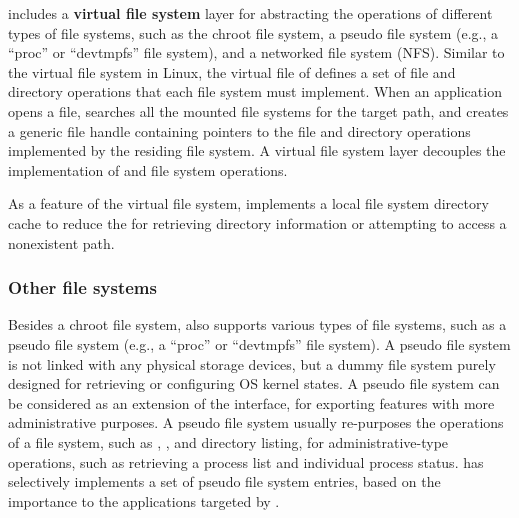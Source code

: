 \thelibos{} includes a {\bf virtual file system} layer for abstracting the operations
of different types of file systems,
such as the chroot file system, a pseudo file system (e.g., a ``proc'' or ``devtmpfs'' file system), and a networked file system (NFS).
Similar to the virtual file system in Linux,
the virtual file of \thelibos{} defines a set of file and directory operations that
each file system must implement.
When an application opens a file,
\thelibos{} searches all the mounted file systems for the target path,
and creates a generic file handle containing pointers
to the file and directory operations implemented by the residing file system.
A virtual file system layer decouples
the implementation of \linuxapis{} and file system operations.


As a feature of the virtual file system, \thelibos{} implements
a local file system directory cache
to reduce the \hostapis{} for retrieving directory information
or attempting to access a nonexistent path.











\subsubsection{Other file systems}


Besides a chroot file system,
\thelibos{} also supports various types of file systems,
such as a pseudo file system
(e.g., a ``proc'' or ``devtmpfs'' file system).
A pseudo file system is not linked with any physical storage devices,
but a dummy file system
purely designed for retrieving or configuring OS kernel states.
A pseudo file system can be considered as an extension of the \linuxapi{} interface,
for exporting features with more administrative purposes.
A pseudo file system usually re-purposes the operations of a file system, such as , , and directory listing,
for administrative-type operations,
such as retrieving a process list and individual process status.
\thelibos{} has selectively implements a set of pseudo file system entries,
based on the importance to the applications targeted by \graphene{}.



